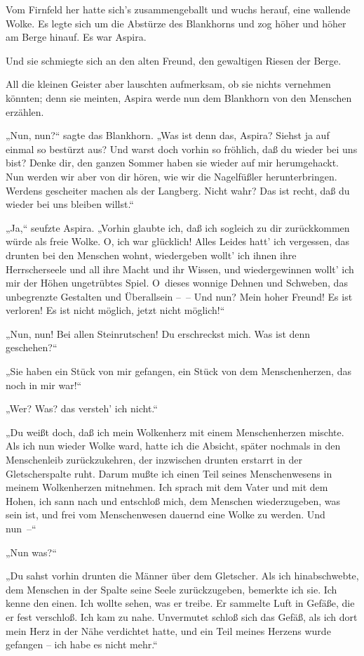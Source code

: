Vom Firnfeld her hatte sich's zusammengeballt und wuchs herauf,
eine wallende Wolke. Es legte sich um die Abstürze des Blankhorns
und zog höher und höher am Berge hinauf. Es war Aspira.

Und sie schmiegte sich an den alten Freund, den gewaltigen Riesen
der Berge.

All die kleinen Geister aber lauschten aufmerksam, ob sie nichts
vernehmen könnten; denn sie meinten, Aspira werde nun dem Blankhorn
von den Menschen erzählen.

„Nun, nun?“ sagte das Blankhorn. „Was ist denn das, Aspira? Siehst
ja auf einmal so bestürzt aus? Und warst doch vorhin so fröhlich,
daß du wieder bei uns bist? Denke dir, den ganzen Sommer haben sie
wieder auf mir herumgehackt. Nun werden wir aber von dir hören, wie
wir die Nagelfüßler herunterbringen. Werdens gescheiter machen als
der Langberg. Nicht wahr? Das ist recht, daß du wieder bei uns
bleiben willst.“

„Ja,“ seufzte Aspira. „Vorhin glaubte ich, daß ich sogleich zu dir
zurückkommen würde als freie Wolke. O, ich war glücklich! Alles
Leides hatt' ich vergessen, das drunten bei den Menschen wohnt,
wiedergeben wollt' ich ihnen ihre Herrscherseele und all ihre Macht
und ihr Wissen, und wiedergewinnen wollt' ich mir der Höhen
ungetrübtes Spiel. O~dieses wonnige Dehnen und Schweben, das
unbegrenzte Gestalten und Überallsein –~– Und nun? Mein hoher
Freund! Es ist verloren! Es ist nicht möglich, jetzt nicht
möglich!“

„Nun, nun! Bei allen Steinrutschen! Du erschreckst mich. Was ist
denn geschehen?“

„Sie haben ein Stück von mir gefangen, ein Stück von dem
Menschenherzen, das noch in mir war!“

„Wer? Was? das versteh' ich nicht.“

„Du weißt doch, daß ich mein Wolkenherz mit einem Menschenherzen
mischte. Als ich nun wieder Wolke ward, hatte ich die Absicht,
später nochmals in den Menschenleib zurückzukehren, der inzwischen
drunten erstarrt in der Gletscherspalte ruht. Darum mußte ich einen
Teil seines Menschenwesens in meinem Wolkenherzen mitnehmen. Ich
sprach mit dem Vater und mit dem Hohen, ich sann nach und entschloß
mich, dem Menschen wiederzugeben, was sein ist, und frei vom
Menschenwesen dauernd eine Wolke zu werden. Und nun~–“

„Nun was?“

„Du sahst vorhin drunten die Männer über dem Gletscher. Als ich
hinabschwebte, dem Menschen in der Spalte seine Seele
zurückzugeben, bemerkte ich sie. Ich kenne den einen. Ich wollte
sehen, was er treibe. Er sammelte Luft in Gefäße, die er fest
verschloß. Ich kam zu nahe. Unvermutet schloß sich das Gefäß, als
ich dort mein Herz in der Nähe verdichtet hatte, und ein Teil
meines Herzens wurde gefangen – ich habe es nicht mehr.“

